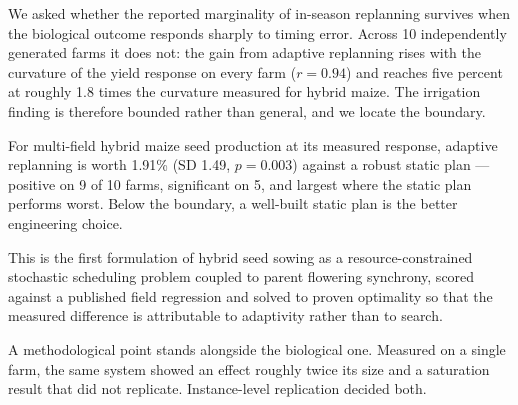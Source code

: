 
We asked whether the reported marginality of in-season replanning survives
when the biological outcome responds sharply to timing error. Across
10 independently generated farms it does not: the gain from adaptive
replanning rises with the curvature of the yield response on every farm
($r = 0.94$) and reaches five percent at roughly 1.8 times the
curvature measured for hybrid maize. The irrigation finding is therefore
bounded rather than general, and we locate the boundary.

For multi-field hybrid maize seed production at its measured response,
adaptive replanning is worth 1.91\% (SD 1.49, $p = 0.003$) against a
robust static plan --- positive on 9 of 10 farms, significant
on 5, and largest where the static plan performs worst. Below the
boundary, a well-built static plan is the better engineering choice.

This is the first formulation of hybrid seed sowing as a resource-constrained
stochastic scheduling problem coupled to parent flowering synchrony, scored
against a published field regression and solved to proven optimality so that
the measured difference is attributable to adaptivity rather than to search.

A methodological point stands alongside the biological one. Measured on a
single farm, the same system showed an effect roughly twice its size and a
saturation result that did not replicate. Instance-level replication decided
both.
